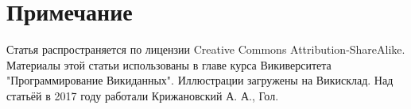 \section{Примечание}

Статья распространяется по лицензии Creative Commons Attribution-ShareAlike. Материалы этой статьи использованы в главе курса Викиверситета "Программирование Викиданных"\cite{WDCountry}. Иллюстрации загружены на Викисклад. Над статьёй в 2017 году работали Крижановский А. А., Гол.